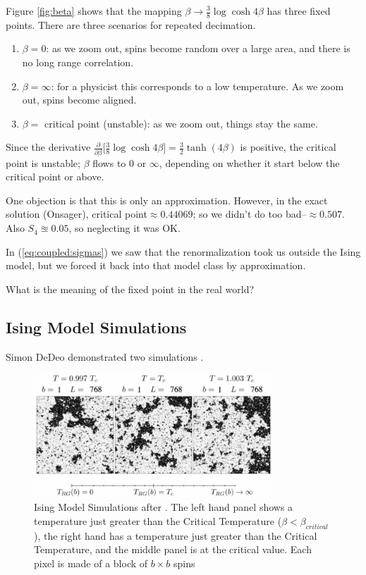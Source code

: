 \documentclass[]{article}
\begin{document}
Figure \ref{fig:beta} shows that the mapping $\beta\rightarrow\frac{3}{8} \log{\cosh{4\beta} }$ has three fixed points. There are three scenarios for repeated decimation.
\begin{enumerate}
	\item $\beta=0$: as we zoom out, spins become random over a large area, and there is no long range correlation.
	\item  $\beta=\infty$: for a physicist this corresponds to a low temperature. As we zoom out, spins become aligned.
	\item  $\beta=$ critical point (unstable): as we zoom out, things stay the same.
\end{enumerate}

Since the derivative  $\frac{\partial}{\partial \beta}\big[\frac{3}{8} \log{\cosh{4\beta}}\big]=\frac{3}{2} \tanh(4\beta)$ is positive, the critical point is unstable; $\beta$ flows to $0$ or $\infty$, depending on whether it start below the critical point or above.

One objection is that this is only an approximation. However, in the exact solution (Onsager), critical point$\approx0.44069$; so we didn't do too bad--$\approx0.507$. Also $S_4\approxeq0.05$, so neglecting it was OK.

In (\ref{eq:coupled:sigmas}) we saw that the renormalization took us outside the Ising model, but we forced it back into that model class by approximation.

What is the meaning of the fixed point in the real world?

\subsection{Ising Model Simulations}

Simon DeDeo demonstrated two simulations \cite{nottelmann2000ising,ashton2012renormalization}.

\begin{figure}[H]
	\begin{center}
		\caption[Ising Model Simulations after \cite{ashton2012renormalization}]{Ising Model Simulations after \cite{ashton2012renormalization}. The left hand panel shows a temperature just greater than the Critical Temperature ($\beta<\beta_{critical}$), the right hand has a temperature just greater than the Critical Temperature, and the middle panel is at the critical value. Each pixel is made of a block of $b\times b$ spins}
		\includegraphics[width=0.8\textwidth]{DouglasAshton1}
	\end{center}
\end{figure}
\end{document}
